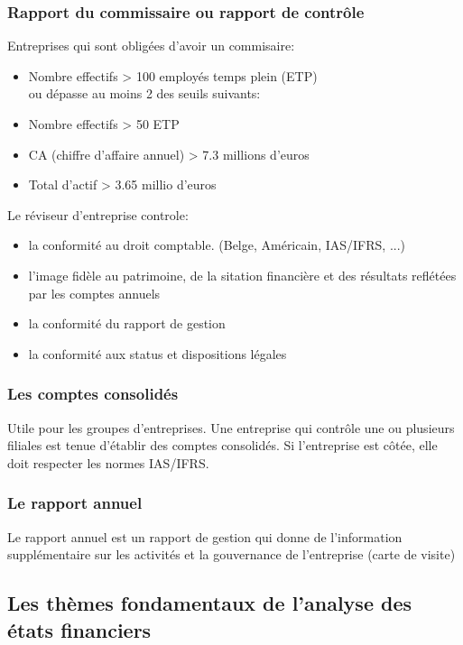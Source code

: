 \documentclass{article}
\begin{document}
\subsubsection*{Rapport du commissaire ou rapport de contrôle}
Entreprises qui sont obligées d'avoir un commisaire:
\begin{itemize}
    \item Nombre effectifs > 100 employés temps plein (ETP)\\
    ou dépasse au moins 2 des seuils suivants:
    \item Nombre effectifs > 50 ETP
    \item CA (chiffre d'affaire annuel) > 7.3 millions d'euros
    \item Total d'actif > 3.65 millio d'euros
\end{itemize}
Le réviseur d'entreprise controle:
\begin{itemize}
    \item la conformité au droit comptable. (Belge, Américain, IAS/IFRS, ...)
    \item l'image fidèle au patrimoine, de la sitation financière et des résultats reflétées par les comptes annuels
    \item la conformité du rapport de gestion
    \item la conformité aux status et dispositions légales
\end{itemize}

\subsubsection*{Les comptes consolidés}
Utile pour les groupes d'entreprises. Une entreprise qui contrôle une ou plusieurs filiales est tenue d'établir des comptes consolidés. Si l'entreprise est côtée, elle doit respecter les normes IAS/IFRS. 

\subsubsection*{Le rapport annuel}
Le rapport annuel est un rapport de gestion qui donne de l'information supplémentaire sur les activités et la gouvernance de l'entreprise (carte de visite)

\subsection{Les thèmes fondamentaux de l'analyse des états financiers}
\end{document}
